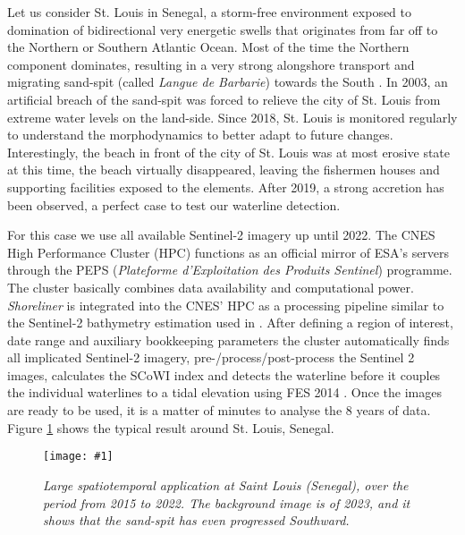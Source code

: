 \documentclass[remotesensing,technicalnote,submit,pdftex,moreauthors]{Definitions/mdpi}
\newcommand{\myfigure}[4]{
    \begin{figure*}[ht!]
        \centering
        \texttt{[image: \#1]}	 
        \caption{\itshape#2}
        \label{#3}
    \end{figure*} 
}
\begin{document}
Let us consider St. Louis in Senegal, a storm-free environment exposed to domination of bidirectional very energetic swells that originates from far off to the Northern or Southern Atlantic Ocean. Most of the time the Northern component dominates, resulting in a very strong alongshore transport and migrating sand-spit (called \textit{Langue de Barbarie}) towards the South \citep{bergsma2020sand, taveneau2021observing}. In 2003, an artificial breach of the sand-spit was forced to relieve the city of St. Louis from extreme water levels on the land-side. Since 2018, St. Louis is monitored regularly to understand the morphodynamics to better adapt to future changes. Interestingly, the beach in front of the city of St. Louis was at most erosive state at this time, the beach virtually disappeared, leaving the fishermen houses and supporting facilities exposed to the elements. After 2019, a strong accretion has been observed, a perfect case to test our waterline detection. 

For this case we use all available Sentinel-2 imagery up until 2022. The CNES High Performance Cluster (HPC) functions as an official mirror of ESA's servers through the PEPS (\textit{Plateforme d'Exploitation des Produits Sentinel}) programme. The cluster basically combines data availability and computational power. \textit{Shoreliner} is integrated into the CNES' HPC as a processing pipeline similar to the Sentinel-2 bathymetry estimation used in \citet{daly2022new}. After defining a region of interest, date range and auxiliary bookkeeping parameters the cluster automatically finds all implicated Sentinel-2 imagery, pre-/process/post-process the Sentinel 2 images, calculates the SCoWI index and detects the waterline before it couples the individual waterlines to a tidal elevation using FES 2014 \citep{Lyard:21}. Once the images are ready to be used, it is a matter of minutes to analyse the 8 years of data. Figure \ref{senegal} shows the typical result around St. Louis, Senegal.

\myfigure{img/senegal_stLouis.png}{Large spatiotemporal application at Saint Louis (Senegal), over the period from 2015 to 2022. The background image is of 2023, and it shows that the sand-spit has even progressed Southward.}{senegal}{1}
\end{document}
